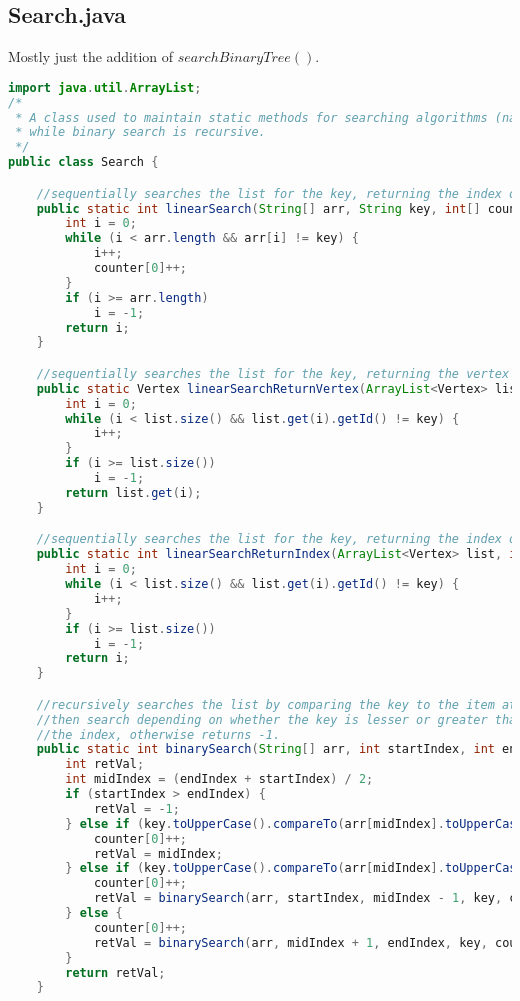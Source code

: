 \documentclass[letterpaper, 10pt,DIV=13]{scrartcl}
\numberwithin{equation}{section} %
\numberwithin{figure}{section} %
\numberwithin{table}{section} %
\begin{document}
\subsection{Search.java}
Mostly just the addition of $searchBinaryTree()$.
\begin{lstlisting}[frame=single, language=java, breaklines]
import java.util.ArrayList;
/*
 * A class used to maintain static methods for searching algorithms (namely linear search and binary search). Linear search is iterative,
 * while binary search is recursive.
 */
public class Search {

    //sequentially searches the list for the key, returning the index of where it was found. If it was not found, returns -1.
    public static int linearSearch(String[] arr, String key, int[] counter) {
        int i = 0;
        while (i < arr.length && arr[i] != key) {
            i++;
            counter[0]++;
        }
        if (i >= arr.length)
            i = -1;
        return i;
    }

    //sequentially searches the list for the key, returning the vertex with that value. Version for ArrayLists.
    public static Vertex linearSearchReturnVertex(ArrayList<Vertex> list, int key) {
        int i = 0;
        while (i < list.size() && list.get(i).getId() != key) {
            i++;
        }
        if (i >= list.size())
            i = -1;
        return list.get(i);
    }

    //sequentially searches the list for the key, returning the index of where it was found. If it was not found, returns -1. version for ArrayLists
    public static int linearSearchReturnIndex(ArrayList<Vertex> list, int key) {
        int i = 0;
        while (i < list.size() && list.get(i).getId() != key) {
            i++;
        }
        if (i >= list.size())
            i = -1;
        return i;
    }

    //recursively searches the list by comparing the key to the item at the middle of the list, then choosing half of the array to
    //then search depending on whether the key is lesser or greater than the element at the middle. If the element is found, returns
    //the index, otherwise returns -1.
    public static int binarySearch(String[] arr, int startIndex, int endIndex, String key, int[] counter) {
        int retVal;
        int midIndex = (endIndex + startIndex) / 2;
        if (startIndex > endIndex) {
            retVal = -1;
        } else if (key.toUpperCase().compareTo(arr[midIndex].toUpperCase()) == 0) {
            counter[0]++;
            retVal = midIndex;
        } else if (key.toUpperCase().compareTo(arr[midIndex].toUpperCase()) < 0) {
            counter[0]++;
            retVal = binarySearch(arr, startIndex, midIndex - 1, key, counter);
        } else {
            counter[0]++;
            retVal = binarySearch(arr, midIndex + 1, endIndex, key, counter);
        }
        return retVal;
    }


\end{lstlisting}
\end{document}
